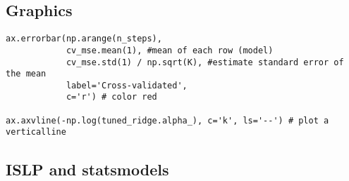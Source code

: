\documentclass[
  letterpaper,
  DIV=11,
  numbers=noendperiod]{scrreprt}
\begin{document}
\subsection{Graphics}\label{graphics-4}

\begin{verbatim}
ax.errorbar(np.arange(n_steps), 
            cv_mse.mean(1), #mean of each row (model)
            cv_mse.std(1) / np.sqrt(K), #estimate standard error of the mean
            label='Cross-validated',
            c='r') # color red
            
ax.axvline(-np.log(tuned_ridge.alpha_), c='k', ls='--') # plot a verticalline
\end{verbatim}

\subsection{ISLP and statsmodels}\label{islp-and-statsmodels-2}
\end{document}
